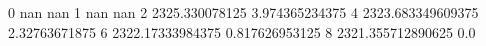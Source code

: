 0 nan nan
1 nan nan
2 2325.330078125 3.974365234375
4 2323.683349609375 2.32763671875
6 2322.17333984375 0.817626953125
8 2321.355712890625 0.0
